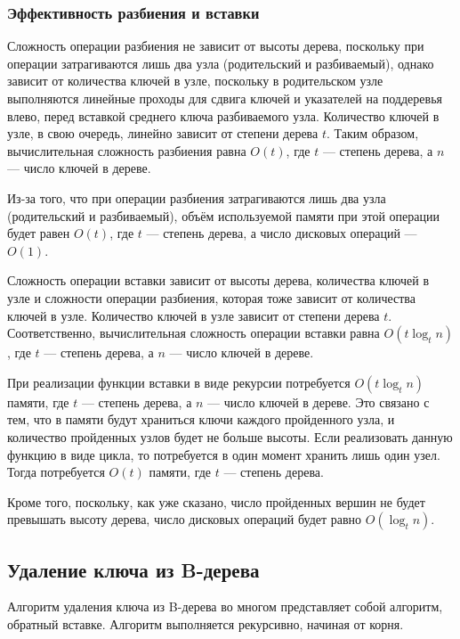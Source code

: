 \documentclass[a4paper,12pt]{article}
\begin{document}
	\subsubsection{Эффективность разбиения и вставки}
	
	Сложность операции разбиения не зависит от высоты дерева, поскольку при операции затрагиваются лишь два узла (родительский и разбиваемый), однако зависит от количества ключей в узле, поскольку в родительском узле выполняются линейные проходы для сдвига ключей и указателей на поддеревья влево, перед вставкой среднего ключа разбиваемого узла. Количество ключей в узле, в свою очередь, линейно зависит от степени дерева $t$. Таким образом, вычислительная сложность разбиения равна $O(t)$, где $t$ --- степень дерева, а $n$ --- число ключей в дереве.
	
	Из-за того, что при операции разбиения затрагиваются лишь два узла (родительский и разбиваемый), объём используемой памяти при этой операции будет равен $O(t)$, где $t$ --- степень дерева, а число дисковых операций --- $O(1)$.
	
	Сложность операции вставки зависит от высоты дерева, количества ключей в узле и сложности операции разбиения, которая тоже зависит от количества ключей в узле. Количество ключей в узле зависит от степени дерева $t$. Соответственно, вычислительная сложность операции вставки равна $O(t\log_t n)$, где $t$ --- степень дерева, а $n$ --- число ключей в дереве.
	
	При реализации функции вставки в виде рекурсии потребуется $O(t\log_t n)$ памяти, где $t$ --- степень дерева, а $n$ --- число ключей в дереве. Это связано с тем, что в памяти будут храниться ключи каждого пройденного узла, и количество пройденных узлов будет не больше высоты. Если реализовать данную функцию в виде цикла, то потребуется в один момент хранить лишь один узел. Тогда потребуется $O(t)$ памяти, где $t$ --- степень дерева.
	
	Кроме того, поскольку, как уже сказано, число пройденных вершин не будет превышать высоту дерева, число дисковых операций будет равно $O(\log_t n)$.
	
	\subsection{Удаление ключа из B-дерева}
	
	Алгоритм удаления ключа из B-дерева во многом представляет собой алгоритм, обратный вставке. Алгоритм выполняется рекурсивно, начиная от корня.
	
\end{document}

